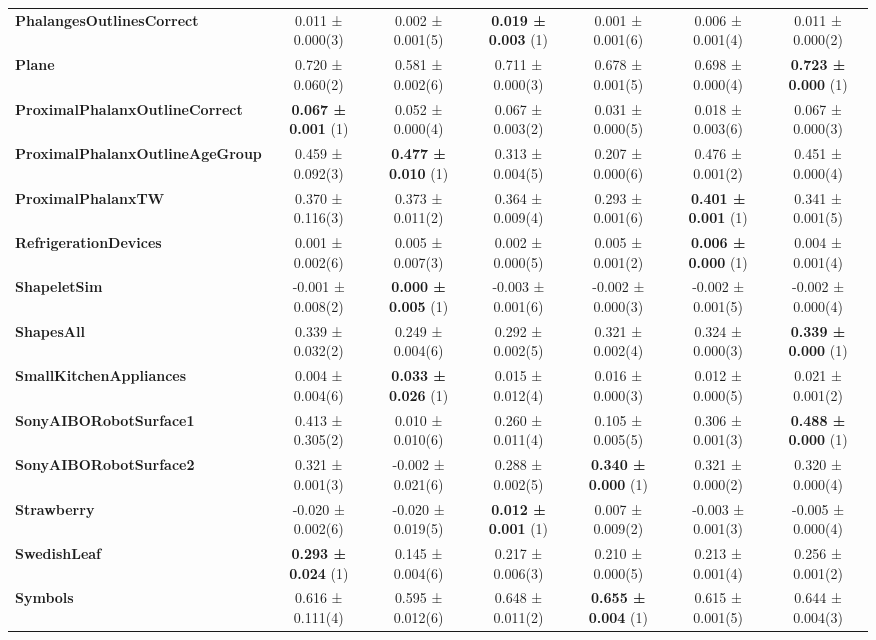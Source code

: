 \begin{table}[ht]
\begin{adjustbox}{width=\textwidth}
\begin{tabular}{lcccccc}
\textbf{PhalangesOutlinesCorrect} & 0.011 ± 0.000(3) & 0.002 ± 0.001(5) & \textbf{0.019 ± 0.003} (1) & 0.001 ± 0.001(6) & 0.006 ± 0.001(4) & 0.011 ± 0.000(2) \\
\textbf{Plane} & 0.720 ± 0.060(2) & 0.581 ± 0.002(6) & 0.711 ± 0.000(3) & 0.678 ± 0.001(5) & 0.698 ± 0.000(4) & \textbf{0.723 ± 0.000} (1) \\
\textbf{ProximalPhalanxOutlineCorrect} & \textbf{0.067 ± 0.001} (1) & 0.052 ± 0.000(4) & 0.067 ± 0.003(2) & 0.031 ± 0.000(5) & 0.018 ± 0.003(6) & 0.067 ± 0.000(3) \\
\textbf{ProximalPhalanxOutlineAgeGroup} & 0.459 ± 0.092(3) & \textbf{0.477 ± 0.010} (1) & 0.313 ± 0.004(5) & 0.207 ± 0.000(6) & 0.476 ± 0.001(2) & 0.451 ± 0.000(4) \\
\textbf{ProximalPhalanxTW} & 0.370 ± 0.116(3) & 0.373 ± 0.011(2) & 0.364 ± 0.009(4) & 0.293 ± 0.001(6) & \textbf{0.401 ± 0.001} (1) & 0.341 ± 0.001(5) \\
\textbf{RefrigerationDevices} & 0.001 ± 0.002(6) & 0.005 ± 0.007(3) & 0.002 ± 0.000(5) & 0.005 ± 0.001(2) & \textbf{0.006 ± 0.000} (1) & 0.004 ± 0.001(4) \\
\textbf{ShapeletSim} & -0.001 ± 0.008(2) & \textbf{0.000 ± 0.005} (1) & -0.003 ± 0.001(6) & -0.002 ± 0.000(3) & -0.002 ± 0.001(5) & -0.002 ± 0.000(4) \\
\textbf{ShapesAll} & 0.339 ± 0.032(2) & 0.249 ± 0.004(6) & 0.292 ± 0.002(5) & 0.321 ± 0.002(4) & 0.324 ± 0.000(3) & \textbf{0.339 ± 0.000} (1) \\
\textbf{SmallKitchenAppliances} & 0.004 ± 0.004(6) & \textbf{0.033 ± 0.026} (1) & 0.015 ± 0.012(4) & 0.016 ± 0.000(3) & 0.012 ± 0.000(5) & 0.021 ± 0.001(2) \\
\textbf{SonyAIBORobotSurface1} & 0.413 ± 0.305(2) & 0.010 ± 0.010(6) & 0.260 ± 0.011(4) & 0.105 ± 0.005(5) & 0.306 ± 0.001(3) & \textbf{0.488 ± 0.000} (1) \\
\textbf{SonyAIBORobotSurface2} & 0.321 ± 0.001(3) & -0.002 ± 0.021(6) & 0.288 ± 0.002(5) & \textbf{0.340 ± 0.000} (1) & 0.321 ± 0.000(2) & 0.320 ± 0.000(4) \\
\textbf{Strawberry} & -0.020 ± 0.002(6) & -0.020 ± 0.019(5) & \textbf{0.012 ± 0.001} (1) & 0.007 ± 0.009(2) & -0.003 ± 0.001(3) & -0.005 ± 0.000(4) \\
\textbf{SwedishLeaf} & \textbf{0.293 ± 0.024} (1) & 0.145 ± 0.004(6) & 0.217 ± 0.006(3) & 0.210 ± 0.000(5) & 0.213 ± 0.001(4) & 0.256 ± 0.001(2) \\
\textbf{Symbols} & 0.616 ± 0.111(4) & 0.595 ± 0.012(6) & 0.648 ± 0.011(2) & \textbf{0.655 ± 0.004} (1) & 0.615 ± 0.001(5) & 0.644 ± 0.004(3) \\

\end{tabular}
\end{adjustbox}
\end{table}
